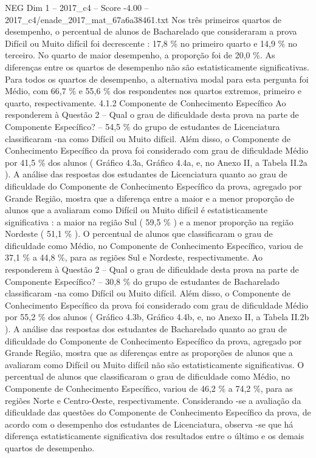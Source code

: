 \begin{textsample}{NEG Dim 1 – 2017\_c4 – Score -4.00 – 2017\_c4/enade\_2017\_mat\_67a6a38461.txt}
Nos três primeiros quartos de desempenho, o percentual de alunos de Bacharelado que consideraram a prova Difícil ou Muito difícil foi decrescente : 17,8 \% no primeiro quarto e 14,9 \% no terceiro.
No quarto de maior desempenho, a proporção foi de 20,0 \%.
As diferenças entre os quartos de desempenho não são estatisticamente significativas.
Para todos os quartos de desempenho, a alternativa modal para esta pergunta foi Médio, com 66,7 \% e 55,6 \% dos respondentes nos quartos extremos, primeiro e quarto, respectivamente. 4.1.2 Componente de Conhecimento Específico Ao responderem à Questão 2 – Qual o grau de dificuldade desta prova na parte de Componente Específico? – 54,5 \% do grupo de estudantes de Licenciatura classificaram -na como Difícil ou Muito difícil.
Além disso, o Componente de Conhecimento Específico da prova foi considerado com grau de dificuldade Médio por 41,5 \% dos alunos ( Gráfico 4.3a, Gráfico 4.4a, e, no Anexo II, a Tabela II.2a ).
A análise das respostas dos estudantes de Licenciatura quanto ao grau de dificuldade do Componente de Conhecimento Específico da prova, agregado por Grande Região, mostra que a diferença entre a maior e a menor proporção de alunos que a avaliaram como Difícil ou Muito difícil é estatisticamente significativa : a maior na região Sul ( 59,5 \% ) e a menor proporção na região Nordeste ( 51,1 \% ).
O percentual de alunos que classificaram o grau de dificuldade como Médio, no Componente de Conhecimento Específico, variou de 37,1 \% a 44,8 \%, para as regiões Sul e Nordeste, respectivamente.
Ao responderem à Questão 2 – Qual o grau de dificuldade desta prova na parte de Componente Específico? – 30,8 \% do grupo de estudantes de Bacharelado classificaram -na como Difícil ou Muito difícil.
Além disso, o Componente de Conhecimento Específico da prova foi considerado com grau de dificuldade Médio por 55,2 \% dos alunos ( Gráfico 4.3b, Gráfico 4.4b, e, no Anexo II, a Tabela II.2b ).
A análise das respostas dos estudantes de Bacharelado quanto ao grau de dificuldade do Componente de Conhecimento Específico da prova, agregado por Grande Região, mostra que as diferenças entre as proporções de alunos que a avaliaram como Difícil ou Muito difícil não são estatisticamente significativas.
O percentual de alunos que classificaram o grau de dificuldade como Médio, no Componente de Conhecimento Específico, variou de 46,2 \% a 74,2 \%, para as regiões Norte e Centro-Oeste, respectivamente.
Considerando -se a avaliação da dificuldade das questões do Componente de Conhecimento Específico da prova, de acordo com o desempenho dos estudantes de Licenciatura, observa -se que há diferença estatisticamente significativa dos resultados entre o último e os demais quartos de desempenho.

\end{textsample}
